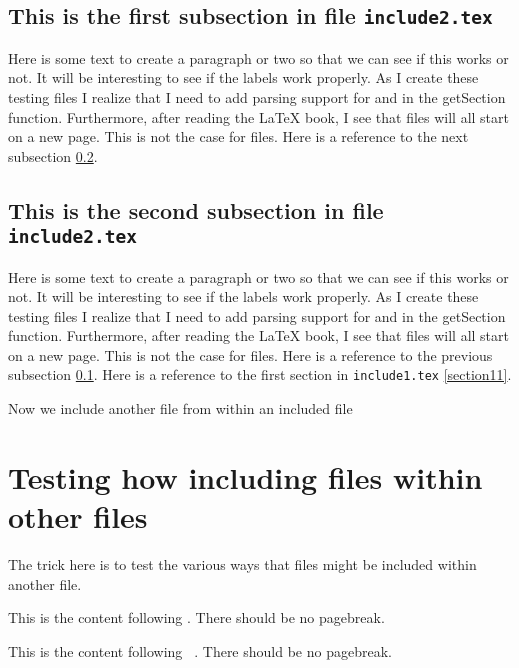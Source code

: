 \subsection{This is the first subsection in file \texttt{include2.tex}}
\label{section21}

Here is some text to create a paragraph or two so that we
can see if this works or not.  It will be interesting to see
if the labels work properly.  As I create these testing files
I realize that I need to add parsing support for \verb##
and \verb## in the getSection function.   Furthermore,
after reading the \LaTeX{} book, I see that \verb## 
files will all start on a new page.  This is not the case for
\verb## files.  Here is a reference to the next subsection \ref{section22}.

\subsection{This is the second subsection in file \texttt{include2.tex}}
\label{section22}

Here is some text to create a paragraph or two so that we
can see if this works or not.  It will be interesting to see
if the labels work properly.  As I create these testing files
I realize that I need to add parsing support for \verb##
and \verb## in the getSection function.   Furthermore,
after reading the \LaTeX{} book, I see that \verb## 
files will all start on a new page.  This is not the case for
\verb## files.  Here is a reference to the previous subsection \ref{section21}.
Here is a reference to the first section in \texttt{include1.tex}
\ref{section11}.

Now we include another file from within an included file

\section{Testing how including files within other files}
\label{section3}

The trick here is to test the various ways that files might be included
within another file.  


This is the content following \verb##.  There should be no
pagebreak.


This is the content following \verb# #.  There should be no
pagebreak.

